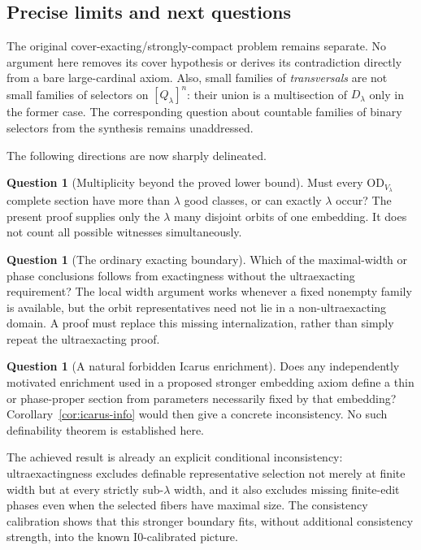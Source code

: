 \documentclass[11pt,letterpaper]{article}
\theoremstyle{definition}
\newcommand{\OD}{\mathrm{OD}}
\newcommand{\Izero}{\mathrm{I0}}
\newtheorem{question}[definition]{Question}
\numberwithin{equation}{section}
\begin{document}
\subsection{Precise limits and next questions}

The original cover-exacting/strongly-compact problem remains separate. No argument here removes its cover hypothesis or derives its contradiction directly from a bare large-cardinal axiom. Also, small families of \emph{transversals} are not small families of selectors on $[Q_\lambda]^n$: their union is a multisection of $D_\lambda$ only in the former case. The corresponding question about countable families of binary selectors from the synthesis remains unaddressed.

The following directions are now sharply delineated.

\begin{question}[Multiplicity beyond the proved lower bound]
Must every $\OD_{V_\lambda}$ complete section have more than $\lambda$ good classes, or can exactly $\lambda$ occur? The present proof supplies only the $\lambda$ many disjoint orbits of one embedding. It does not count all possible witnesses simultaneously.
\end{question}

\begin{question}[The ordinary exacting boundary]
Which of the maximal-width or phase conclusions follows from exactingness without the ultraexacting requirement? The local width argument works whenever a fixed nonempty family is available, but the orbit representatives need not lie in a non-ultraexacting domain. A proof must replace this missing internalization, rather than simply repeat the ultraexacting proof.
\end{question}

\begin{question}[A natural forbidden Icarus enrichment]
Does any independently motivated enrichment used in a proposed stronger embedding axiom define a thin or phase-proper section from parameters necessarily fixed by that embedding? Corollary~\ref{cor:icarus-info} would then give a concrete inconsistency. No such definability theorem is established here.
\end{question}

The achieved result is already an explicit conditional inconsistency: ultraexactingness excludes definable representative selection not merely at finite width but at every strictly sub-$\lambda$ width, and it also excludes missing finite-edit phases even when the selected fibers have maximal size. The consistency calibration shows that this stronger boundary fits, without additional consistency strength, into the known $\Izero$-calibrated picture.
\end{document}
